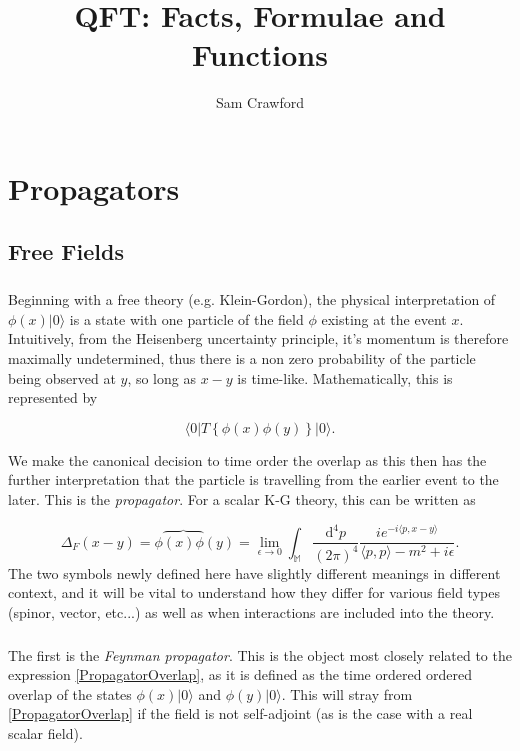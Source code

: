 \documentclass[12pt]{report}
\begin{document}
\title{QFT: Facts, Formulae and Functions}
\author{Sam Crawford}
\maketitle
{}
\chapter{Propagators}

\section{Free Fields}

\paragraph{} Beginning with a free theory (e.g. Klein-Gordon), the physical interpretation of $\phi(x)|0\rangle$ is a state with one particle of the field $\phi$ existing at the event $x$. Intuitively, from the Heisenberg uncertainty principle, it's momentum is therefore maximally undetermined, thus there is a non zero probability of the particle being observed at $y$, so long as $x-y$ is time-like. Mathematically, this is represented by

	\begin{equation}	\label{PropagatorOverlap}
		\langle 0 | T\left\{ \phi(x) \phi(y) \right\} | 0 \rangle.
	\end{equation}

We make the canonical decision to time order the overlap as this then has the further interpretation that the particle is travelling from the earlier event to the later. This is the \textit{propagator}. For a scalar K-G theory, this can be written as

	\begin{equation}	\label{FeynmanAndContraction}
		\Delta_F(x-y) = \phi\overbrace{(x)\phi}(y) =
		\lim_{\epsilon \to 0} \int_\mathbb{M}\frac{\mathrm{d}^4p}{(2\pi)^4} \frac{i e^{-i \langle p , x-y \rangle}}{ \langle p, p \rangle - m^2 + i\epsilon}.
	\end{equation}
The two symbols newly defined here have slightly different meanings in different context, and it will be vital to understand how they differ for various field types (spinor, vector, etc...) as well as when interactions are included into the theory.

\paragraph{}The first is the \textit{Feynman propagator}. This is the object most closely related to the expression \eqref{PropagatorOverlap}, as it is defined as the time ordered ordered overlap of the states $\phi(x) |0 \rangle$ and $\phi(y) | 0 \rangle$. This will stray from \eqref{PropagatorOverlap} if the field is not self-adjoint (as is the case with a real scalar field).
\end{document}
